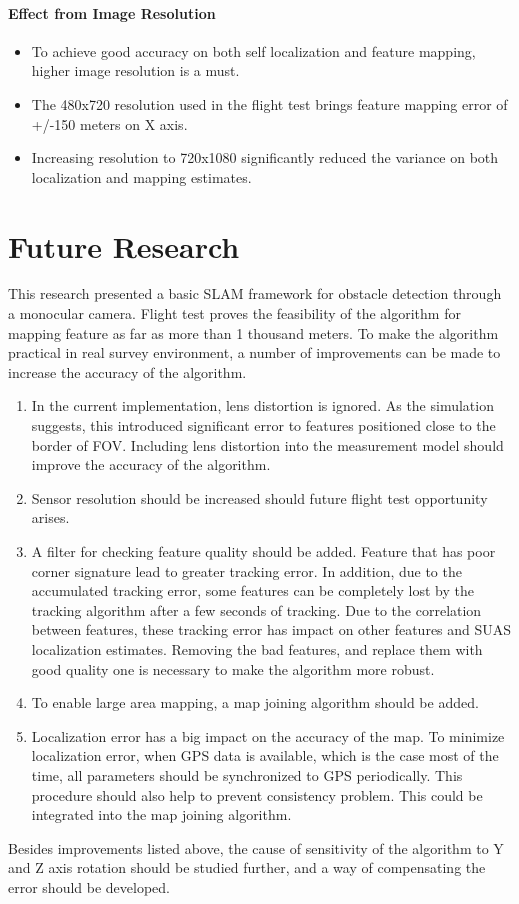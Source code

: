 \paragraph{Effect from Image Resolution}
\begin{itemize}
  \item To achieve good accuracy on both self localization and feature mapping, higher image resolution is a must. 
  \item The 480x720 resolution used in the flight test brings feature mapping error of +/-150 meters on X axis.
  \item Increasing resolution to 720x1080 significantly reduced the variance on both localization and mapping estimates. 
\end{itemize}

\section{Future Research}
This research presented a basic SLAM framework for obstacle detection through a monocular camera. Flight test proves the feasibility of the algorithm for mapping feature as far as more than 1 thousand meters. To make the algorithm practical in real survey environment, a number of improvements can be made to increase the accuracy of the algorithm.
\begin{enumerate}
  \item In the current implementation, lens distortion is ignored. As the simulation suggests, this introduced significant error to features positioned close to the border of FOV. Including lens distortion into the measurement model should improve the accuracy of the algorithm.
  \item Sensor resolution should be increased should future flight test opportunity arises. 
  \item A filter for checking feature quality should be added. Feature that has poor corner signature lead to greater tracking error. In addition, due to the accumulated tracking error, some features can be completely lost by the tracking algorithm after a few seconds of tracking. Due to the correlation between features, these tracking error has impact on other features and SUAS localization estimates. Removing the bad features, and replace them with good quality one is necessary to make the algorithm more robust.
  \item To enable large area mapping, a map joining algorithm should be added.
  \item Localization error has a big impact on the accuracy of the map. To minimize localization error, when GPS data is available, which is the case most of the time, all parameters should be synchronized to GPS periodically. This procedure should also help to prevent consistency problem. This could be integrated into the map joining algorithm.  
\end{enumerate}

Besides improvements listed above, the cause of sensitivity of the algorithm to Y and Z axis rotation should be studied further, and a way of compensating the error should be developed. 

